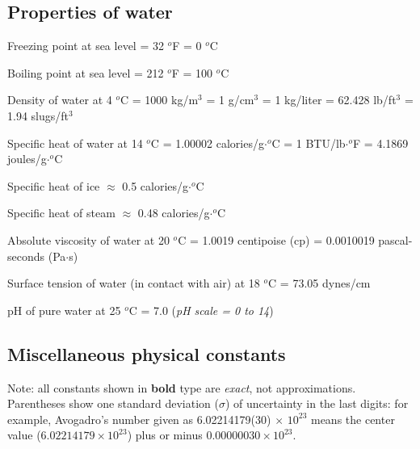 \filbreak
\subsection{Properties of water}

\noindent
Freezing point at sea level = 32 $^{o}$F = 0 $^{o}$C

\vskip 5pt

\noindent
Boiling point at sea level = 212 $^{o}$F = 100 $^{o}$C

\vskip 5pt

\noindent
Density of water at 4 $^{o}$C = 1000 kg/m$^{3}$ = 1 g/cm$^{3}$ = 1 kg/liter = 62.428 lb/ft$^{3}$ = 1.94 slugs/ft$^{3}$

\vskip 5pt

\noindent
Specific heat of water at 14 $^{o}$C = 1.00002 calories/g$\cdot$$^{o}$C = 1 BTU/lb$\cdot$$^{o}$F = 4.1869 joules/g$\cdot$$^{o}$C

\vskip 5pt

\noindent
Specific heat of ice $\approx$ 0.5 calories/g$\cdot$$^{o}$C

\vskip 5pt

\noindent
Specific heat of steam $\approx$ 0.48 calories/g$\cdot$$^{o}$C

\vskip 5pt

\noindent
Absolute viscosity of water at 20 $^{o}$C = 1.0019 centipoise (cp) = 0.0010019 pascal-seconds (Pa$\cdot$s)

\vskip 5pt

\noindent
Surface tension of water (in contact with air) at 18 $^{o}$C = 73.05 dynes/cm

\vskip 5pt

\noindent
pH of pure water at 25 $^{o}$C = 7.0 (\textit{pH scale = 0 to 14})






\filbreak
\subsection{Miscellaneous physical constants}

Note: all constants shown in \textbf{bold} type are \textit{exact}, not approximations.  Parentheses show one standard deviation ($\sigma$) of uncertainty in the last digits: for example, Avogadro's number given as 6.02214179(30) $\times$ $10^{23}$ means the center value ($6.02214179 \times 10^{23}$) plus or minus $0.00000030 \times 10^{23}$.

\vskip 10pt

